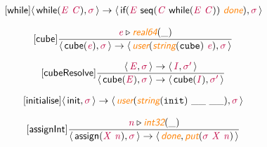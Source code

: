 \documentclass[10pt,leqno,fleqn]{article}
\newcommand{\artVariable}[1]{\mbox{\color{purple}\em #1\/}}
\newcommand{\artConstructor}[1]{\mbox{\sf #1}}
\newcommand{\artCaseInsensitiveLiteral}[1]{\mbox{\tt #1}}
\newcommand{\artSpecial}[1]{\mbox{\color{orange}\sf\em #1}}
\begin{document}
\begin{equation}
\tag*{[\artConstructor{\sf while}]}
\begin{split}\langle\, \artConstructor{\sf while}(\artVariable{E}\ \artVariable{C}), \artVariable{$\sigma$}\,\rangle \rightarrow \langle\, \artConstructor{\sf if}(\artVariable{E}\ \artConstructor{\sf seq}(\artVariable{C}\ \artConstructor{\sf while}(\artVariable{E}\ \artVariable{C}))\ \artSpecial{done}), \artVariable{$\sigma$}\,\rangle 
\end{split}
\end{equation}

\begin{equation}
\tag*{[\artConstructor{\sf cube}]}
\begin{split}\frac{ \artVariable{e}\triangleright \artSpecial{real64}(\_) }{\langle\, \artConstructor{\sf cube}(\artVariable{e}), \artVariable{$\sigma$}\,\rangle \rightarrow \langle\, \artSpecial{user}(\artSpecial{string}(\artCaseInsensitiveLiteral{cube})\ \artVariable{e}), \artVariable{$\sigma$}\,\rangle }
\end{split}
\end{equation}

\begin{equation}
\tag*{[\artConstructor{\sf cubeResolve}]}
\begin{split}\frac{\langle\, \artVariable{E}, \artVariable{$\sigma$}\,\rangle \rightarrow \langle\, \artVariable{I}, \artVariable{$\sigma$\/$^\prime$}\,\rangle }{\langle\, \artConstructor{\sf cube}(\artVariable{E}), \artVariable{$\sigma$}\,\rangle \rightarrow \langle\, \artConstructor{\sf cube}(\artVariable{I}), \artVariable{$\sigma$\/$^\prime$}\,\rangle }
\end{split}
\end{equation}

\begin{equation}
\tag*{[\artConstructor{\sf initialise}]}
\begin{split}\langle\, \artConstructor{\sf init}, \artVariable{$\sigma$}\,\rangle \rightarrow \langle\, \artSpecial{user}(\artSpecial{string}(\artCaseInsensitiveLiteral{init})\ \_\_\ \_\_), \artVariable{$\sigma$}\,\rangle 
\end{split}
\end{equation}

\begin{equation}
\tag*{[\artConstructor{\sf assignInt}]}
\begin{split}\frac{ \artVariable{n}\triangleright \artSpecial{int32}(\_) }{\langle\, \artConstructor{\sf assign}(\artVariable{X}\ \artVariable{n}), \artVariable{$\sigma$}\,\rangle \rightarrow \langle\, \artSpecial{done}, \artSpecial{put}(\artVariable{$\sigma$}\ \artVariable{X}\ \artVariable{n})\,\rangle }
\end{split}
\end{equation}
\end{document}
